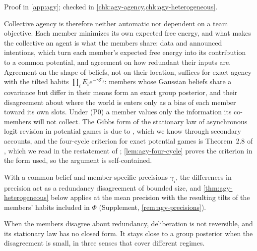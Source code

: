 \begin{theorem}
\begin{enumerate}
\end{enumerate}
Proof in \cref{app:agy}; checked in \cref{chk:agy-agency,chk:agy-heterogeneous}.
\end{theorem}

Collective agency is therefore neither automatic nor dependent on a team objective. Each member minimizes its own expected free energy, and what makes the collective an agent is what the members share: data and announced intentions, which turn each member's expected free energy into its contribution to a common potential, and agreement on how redundant their inputs are. Agreement on the shape of beliefs, not on their location, suffices for exact agency with the tilted habits $\prod_iE_ie^{-\gamma\mathcal T_i}$: members whose Gaussian beliefs share a covariance but differ in their means form an exact group posterior, and their disagreement about where the world is enters only as a bias of each member toward its own slots. Under (P0) a member values only the information its co-members will not collect. The Gibbs form of the stationary law of asynchronous logit revision in potential games is due to \citet{blume1993statistical}, which we know through secondary accounts, and the four-cycle criterion for exact potential games is Theorem~2.8 of \citet{monderer1996potential}, which we read in the restatement of \citet{arefizadeh2024characterizations}; \cref{lem:agy-four-cycle} proves the criterion in the form used, so the argument is self-contained.

With a common belief and member-specific precisions $\gamma_i$, the differences in precision act as a redundancy disagreement of bounded size, and \cref{thm:agy-heterogeneous} below applies at the mean precision with the resulting tilts of the members' habits included in $\Phi$ (Supplement, \cref{rem:agy-precisions}).

When the members disagree about redundancy, deliberation is not reversible, and its stationary law has no closed form. It stays close to a group posterior when the disagreement is small, in three senses that cover different regimes.

